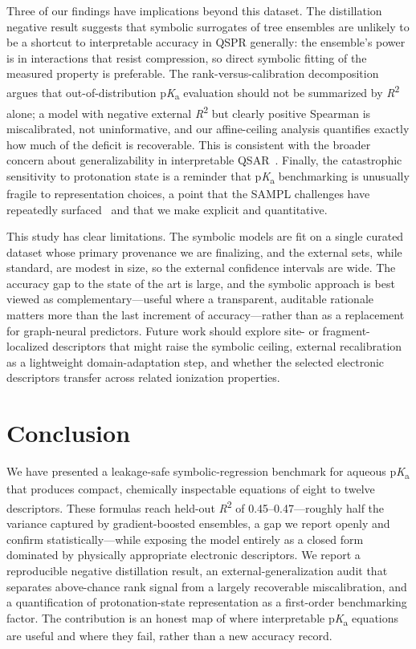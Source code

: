 \documentclass[11pt]{article}
\newcommand{\pka}{p\textit{K}\textsubscript{a}}
\newcommand{\rtwo}{\textit{R}\textsuperscript{2}}
\begin{document}
Three of our findings have implications beyond this dataset. The distillation negative result
suggests that symbolic surrogates of tree ensembles are unlikely to be a shortcut to
interpretable accuracy in QSPR generally: the ensemble's power is in interactions that resist
compression, so direct symbolic fitting of the measured property is preferable. The
rank-versus-calibration decomposition argues that out-of-distribution \pka{} evaluation should
not be summarized by \rtwo{} alone; a model with negative external \rtwo{} but clearly positive
Spearman is miscalibrated, not uninformative, and our affine-ceiling analysis quantifies exactly
how much of the deficit is recoverable. This is consistent with the broader concern about
generalizability in interpretable QSAR~\cite{shirasawa2024figp2}. Finally, the catastrophic
sensitivity to protonation state is a reminder that \pka{} benchmarking is unusually fragile to
representation choices, a point that the SAMPL challenges have repeatedly
surfaced~\cite{isik2021sampl6pka,bergazin2021sampl7} and that we make explicit and quantitative.

This study has clear limitations. The symbolic models are fit on a single curated dataset whose
primary provenance we are finalizing, and the external sets, while standard, are modest in size,
so the external confidence intervals are wide. The accuracy gap to the state of the art is large,
and the symbolic approach is best viewed as complementary---useful where a transparent, auditable
rationale matters more than the last increment of accuracy---rather than as a replacement for
graph-neural predictors. Future work should explore site- or fragment-localized descriptors that
might raise the symbolic ceiling, external recalibration as a lightweight domain-adaptation step,
and whether the selected electronic descriptors transfer across related ionization properties.

\section{Conclusion}

We have presented a leakage-safe symbolic-regression benchmark for aqueous \pka{} that produces
compact, chemically inspectable equations of eight to twelve descriptors. These formulas reach
held-out \rtwo{} of 0.45--0.47---roughly half the variance captured by gradient-boosted
ensembles, a gap we report openly and confirm statistically---while exposing the model entirely
as a closed form dominated by physically appropriate electronic descriptors. We report a
reproducible negative distillation result, an external-generalization audit that separates
above-chance rank signal from a largely recoverable miscalibration, and a quantification of
protonation-state representation as a first-order benchmarking factor. The contribution is an
honest map of where interpretable \pka{} equations are useful and where they fail, rather than a
new accuracy record.
\end{document}
